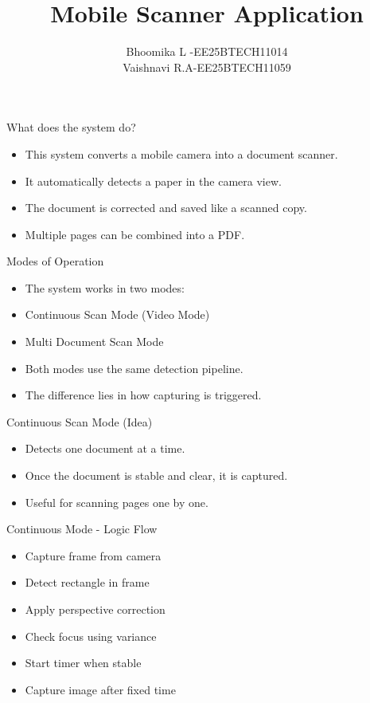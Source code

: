 \documentclass{beamer}
\title{Mobile Scanner Application}
\author{Bhoomika L -EE25BTECH11014\\Vaishnavi R.A-EE25BTECH11059}
\date{}
\begin{document}
\frame{\titlepage}

\begin{frame}{What does the system do?}
\begin{itemize}
\item This system converts a mobile camera into a document scanner.
\item It automatically detects a paper in the camera view.
\item The document is corrected and saved like a scanned copy.
\item Multiple pages can be combined into a PDF.
\end{itemize}
\end{frame}

\begin{frame}{Modes of Operation}
\begin{itemize}
\item The system works in two modes:
\item Continuous Scan Mode (Video Mode)
\item Multi Document Scan Mode
\item Both modes use the same detection pipeline.
\item The difference lies in how capturing is triggered.
\end{itemize}
\end{frame}

\begin{frame}{Continuous Scan Mode (Idea)}
\begin{itemize}
\item Detects one document at a time.
\item Once the document is stable and clear, it is captured.
\item Useful for scanning pages one by one.
\end{itemize}
\end{frame}

\begin{frame}{Continuous Mode - Logic Flow}
\begin{itemize}
\item Capture frame from camera
\item Detect rectangle in frame
\item Apply perspective correction
\item Check focus using variance
\item Start timer when stable
\item Capture image after fixed time
\end{itemize}
\end{frame}
\end{document}
